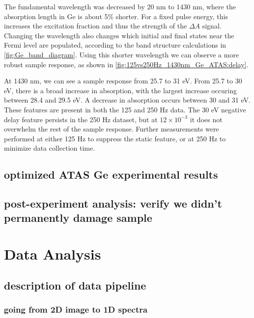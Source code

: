The fundamental wavelength was decreased by 20 nm to 1430 nm, where the absorption length in Ge is about 5\% shorter. For a fixed pulse energy, this increases the excitation fraction and thus the strength of the $\Delta A$ signal. Changing the wavelength also changes which initial and final states near the Fermi level are populated, according to the band structure calculations in \cref{fig:Ge_band_diagram}. Using this shorter wavelength we can observe a more robust sample response, as shown in \cref{fig:125vs250Hz_1430nm_Ge_ATAS:delay}.

At 1430 nm, we can see a sample response from 25.7 to 31 eV. From 25.7 to 30 eV, there is a broad increase in absorption, with the largest increase occuring between 28.4 and 29.5 eV. A decrease in absorption occurs between 30 and 31 eV. These features are present in both the 125 and 250 Hz data. The 30 eV negative delay feature persists in the 250 Hz dataset, but at $12 \times 10^{-3}$ it does not overwhelm the rest of the sample response. Further measurements were performed at either 125 Hz to suppress the static feature, or at 250 Hz to minimize data collection time.


\subsection{optimized ATAS Ge experimental results}

\subsection{post-experiment analysis: verify we didn't permanently damage sample}

\section{Data Analysis}

\subsection{description of data pipeline}
\subsubsection{going from 2D image to 1D spectra}

